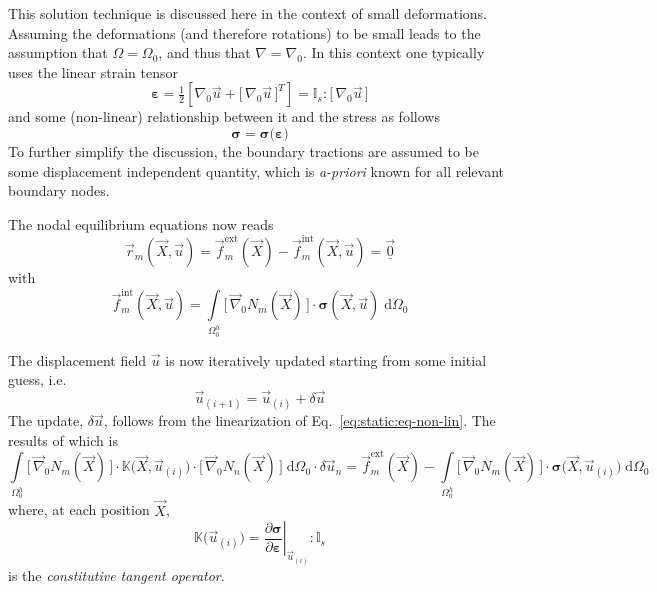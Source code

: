 \documentclass[times,namecite]{goose-article}
\begin{document}
This solution technique is discussed here in the context of small deformations. Assuming the deformations (and therefore rotations) to be small leads to the assumption that $\Omega = \Omega_0$, and thus that $\nabla = \nabla_0$. In this context one typically uses the linear strain tensor
\begin{equation}
  \bm{\varepsilon}
  =
  \tfrac{1}{2} \left[ \nabla_0 \vec{u} + \big[\, \nabla_0 \vec{u} \,\big]^T \right]
  =
  \mathbb{I}_s : \big[\, \nabla_0 \vec{u} \,\big]
\end{equation}
and some (non-linear) relationship between it and the stress as follows
\begin{equation}
  \bm{\sigma} = \bm{\sigma} \big( \bm{\varepsilon} \big)
\end{equation}
To further simplify the discussion, the boundary tractions are assumed to be some displacement independent quantity, which is \textit{a-priori} known for all relevant boundary nodes.

The nodal equilibrium equations now reads
\begin{equation}
\label{eq:static:eq-non-lin}
  \vec{r}_m(\vec{X}, \vec{u})
  =
  \vec{f}_m^\mathrm{ext}(\vec{X})
  -
  \vec{f}_m^\mathrm{int}(\vec{X}, \vec{u})
  =
  \underline{\vec{0}}
\end{equation}
with
\begin{equation}
  \vec{f}_m^\mathrm{int}(\vec{X}, \vec{u})
  =
  \int\limits_{\Omega^h_0}
    \big[\, \vec{\nabla}_0 N_m(\vec{X}) \,\big]
    \cdot
    \bm{\sigma}(\vec{X}, \vec{u}) \;
  \mathrm{d}\Omega_0
\end{equation}

The displacement field $\vec{u}$ is now iteratively updated starting from some initial guess, i.e.
\begin{equation}
  \vec{u}_{(i+1)} = \vec{u}_{(i)} + \delta \vec{u}
\end{equation}
The update, $\delta \vec{u}$, follows from the linearization of Eq.~\eqref{eq:static:eq-non-lin}. The results of which is
\begin{equation}
  \int\limits_{\Omega^h_0}
    \big[\, \vec{\nabla}_0 N_m(\vec{X}) \,\big]
    \cdot
    \mathbb{K}\big(\vec{X},\vec{u}_{(i)}\big)
    \cdot
    \big[\, \vec{\nabla}_0 N_n(\vec{X}) \,\big] \;
  \mathrm{d}\Omega_0
  \cdot \delta \vec{u}_n
  =
  \vec{f}_m^\mathrm{ext}(\vec{X})
  -
  \int\limits_{\Omega^h_0}
    \big[\, \vec{\nabla}_0 N_m(\vec{X}) \,\big]
    \cdot
    \bm{\sigma}\big(\vec{X},\vec{u}_{(i)}\big) \;
  \mathrm{d}\Omega_0
\end{equation}
where, at each position $\vec{X}$,
\begin{equation}
  \mathbb{K}\big(\vec{u}_{(i)}\big)
  =
  \left. \frac{\partial \bm{\sigma}}{\partial \bm{\varepsilon}} \right|_{\vec{u}_{(i)}}
  :
  \mathbb{I}_s
\end{equation}
is the \emph{constitutive tangent operator}.
\end{document}
